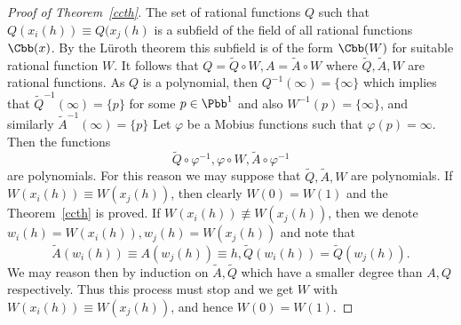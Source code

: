 \begin{proof}[Proof of Theorem~\ref{ccth}]
The set of rational functions $Q$ such that $ Q(x_i(h)) \equiv Q(x_j(h)$ is a subfield of the field of all rational functions $\Cbb(x)$. By the Lüroth theorem this subfield is of the form $\Cbb(W)$ for suitable rational function $W$. It follows that $Q= \tilde Q \circ W, A = \tilde A \circ W$ where $\tilde Q, \tilde A, W$ are rational functions. As $Q$ is a polynomial, then $Q^{-1}(\infty)= \{ \infty \}$ which implies that $\tilde Q^{-1}(\infty) = \{p\}$ for some $p\in \Pbb^1$ and also $W^{-1}(p) = \{\infty\}$, and similarly $\tilde A^{-1}(\infty) = \{p\}$ Let $\varphi$ be a Mobius functions such that $\varphi(p)=\infty$. Then the functions
\[
\tilde Q \circ \varphi^{-1}, \varphi \circ W, \tilde A \circ \varphi^{-1}
\]
are polynomials. For this reason we may suppose that $\tilde Q, \tilde A, W$ are polynomials. If $W(x_i(h))\equiv W(x_j(h)) $, then clearly $W(0) = W(1)$ and the Theorem~\ref{ccth} is proved. If $W(x_i(h))\not\equiv W(x_j(h)) $, then we denote $ w_i(h) = W(x_i(h)), w_j(h) = W(x_j(h)) $ and note that
\[
\tilde A(w_i(h)) \equiv A(w_j(h)) \equiv h, \tilde Q(w_i(h)) = \tilde Q(w_j(h)).
\]
We may reason then by induction on $\tilde A, \tilde Q$ which have a smaller degree than $A, Q$ respectively. Thus this process must stop and we get $W$ with $W(x_i(h))\equiv W(x_j(h)) $, and hence $W(0)=W(1)$.
\end{proof}



